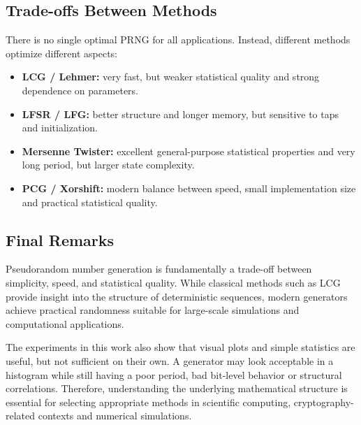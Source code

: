 \subsection{Trade-offs Between Methods}

There is no single optimal PRNG for all applications. Instead, different methods optimize different aspects:

\begin{itemize}
    \item \textbf{LCG / Lehmer:} very fast, but weaker statistical quality and strong dependence on parameters.
    \item \textbf{LFSR / LFG:} better structure and longer memory, but sensitive to taps and initialization.
    \item \textbf{Mersenne Twister:} excellent general-purpose statistical properties and very long period, but larger state complexity.
    \item \textbf{PCG / Xorshift:} modern balance between speed, small implementation size and practical statistical quality.
\end{itemize}

\subsection{Final Remarks}

Pseudorandom number generation is fundamentally a trade-off between simplicity, speed, and statistical quality. While classical methods such as LCG provide insight into the structure of deterministic sequences, modern generators achieve practical randomness suitable for large-scale simulations and computational applications.

The experiments in this work also show that visual plots and simple statistics are useful, but not sufficient on their own. A generator may look acceptable in a histogram while still having a poor period, bad bit-level behavior or structural correlations. Therefore, understanding the underlying mathematical structure is essential for selecting appropriate methods in scientific computing, cryptography-related contexts and numerical simulations.
